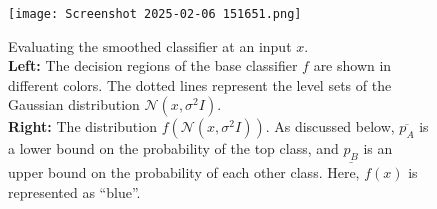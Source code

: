 \documentclass{article}
\theoremstyle{plain}
\theoremstyle{definition}
\theoremstyle{remark}
\begin{document}
\begin{figure}[h]
    \centering
    \texttt{[image: Screenshot 2025-02-06 151651.png]}
    \caption{
        Evaluating the smoothed classifier at an input \( x \). 
        \\
        \textbf{Left:} The decision regions of the base classifier \( f \) are shown in different colors. The dotted lines represent the level sets of the Gaussian distribution \( \mathcal{N}(x, \sigma^2 I) \).
        \\
        \textbf{Right:} The distribution \( f(\mathcal{N}(x, \sigma^2 I)) \). As discussed below, \( \overline{p_A} \) is a lower bound on the probability of the top class, and \( \underline{p_B} \) is an upper bound on the probability of each other class. Here, \( f(x) \) is represented as “blue”.
    }
    \label{fig:smoothed_classifier}
\end{figure}
\end{document}

